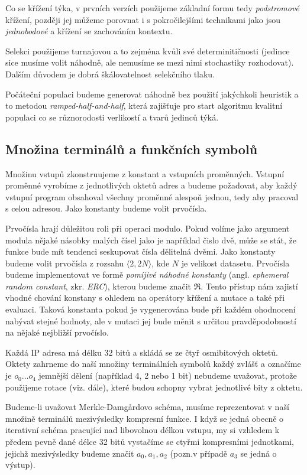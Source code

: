 Co se křížení týka, v prvních verzích použijeme základní formu tedy \textit{podstromové}
křížení, později jej můžeme porovnat i s pokročilejšími technikami jako jsou 
\textit{jednobodové} a křížení se zachováním kontextu. 

Selekci použijeme turnajovou a to zejména kvůli své determinitičnosti (jedince
sice musíme volit náhodně, ale nemusíme se mezi nimi stochastiky rozhodovat). Dalším důvodem
je dobrá škálovatelnost selekčního tlaku.

Počáteční populaci budeme generovat náhodně bez použití jakýchkoli heuristik
a to metodou \textit{ramped-half-and-half}, která zajišťuje pro start algoritmu
kvalitní populaci co se různorodosti verlikostí a tvarů jedinců týká. 

\subsection{Množina terminálů a funkčních symbolů}

Množinu vstupů zkonstruujeme z konstant a vstupních proměnných. Vstupní
proměnné vyrobíme z jednotlivých oktetů adres a budeme požadovat, aby každý
vstupní program obsahoval všechny proměnné alespoň jednou, tedy aby pracoval
s celou adresou. Jako konstanty budeme volit prvočísla. 

Prvočísla hrají důležitou roli při operaci modulo. Pokud volíme jako argument modula nějaké
násobky malých čísel jako je například čislo dvě, může se stát, že funkce bude
mít tendenci seskupovat čísla dělitelná dvěmi. Jako konstanty budeme volit
prvočísla z rozsahu $\langle 2, 2N \rangle$, kde $N$ je velikost datasetu. Prvočísla
budeme implementovat ve formě \textit{pomíjivé náhodné konstanty} (angl. \textit{ephemeral
random constant}, zkr. \textit{ERC}), kterou budeme značit $\Re$. Tento přístup nám
zajistí vhodné chování konstany s ohledem na operátory křížení a mutace a také při
evaluaci. Taková konstanta pokud je vygenerována bude při každém ohodnocení 
nabývat stejné hodnoty, ale v mutaci jej bude měnit s určitou pravděpodobností na
nějaké nejbližší prvočíslo. 

Každá IP adresa má délku 32 bitů a skládá se ze čtyř osmibitových oktetů. Oktety zahrneme
do naší množiny terminálních symbolů každý zvlášť a označíme je $o_0 \ldots o_4$ jemnější 
dělení (například 4, 2 nebo 1 bit) nebudeme uvažovat, protože použijeme rotace (viz. dále),
které budou schopny vybrat jednotlivé bity z oktetu.

Budeme-li uvažovat Merkle-Damg\r{a}rdovo schéma, musíme reprezentovat v naší
množině terminálů mezivýsledky kompresní funkce. I když se jedná obecně o iterativní
schéma pracující nad libovolnou délkou vstupu, my si vzhledem k předem pevně 
dané délce 32 bitů vystačíme se ctyřmi kompresními jednotkami, jejichž mezivýsledky
budeme značit $a_0, a_1, a_2$ (pozn.v případě $a_3 $ se jedná o výstup). 

